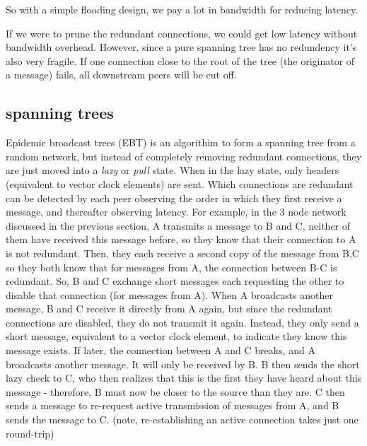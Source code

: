 \documentclass[sigconf]{acmart}
\begin{document}
So with a simple flooding design, we pay a lot in bandwidth for
reducing latency.

If we were to prune the redundant connections, we could get low
latency without bandwidth overhead. However, since a pure spanning
tree has no redundency it's also very fragile. If one connection close
to the root of the tree (the originator of a message) fails, all
downstream peers will be cut off.

\subsection{spanning trees}

Epidemic broadcast trees (EBT) is an algorithim to form a spanning
tree from a random network, but instead of completely removing
redundant connections, they are just moved into a {\em lazy} or {\em
  pull} state. When in the lazy state, only headers (equivalent to
vector clock elements) are sent. Which connections are redundant can
be detected by each peer observing the order in which they first
receive a message, and thereafter observing latency. For example, in
the 3 node network discussed in the previous section, A transmits a
message to B and C, neither of them have received this message before,
so they know that their connection to A is not redundant. Then, they
each receive a second copy of the message from B,C so they both know
that for messages from A, the connection between B-C is redundant.
So, B and C exchange short messages each requesting the other to
disable that connection (for messages from A). When A broadcasts
another message, B and C receive it directly from A again, but since
the redundant connections are disabled, they do not transmit it
again. Instead, they only send a short message, equivalent to a vector
clock element, to indicate they know this message exists. If later,
the connection between A and C breaks, and A broadcasts another
message. It will only be received by B.  B then sends the short lazy
check to C, who then realizes that this is the first they have heard
about this message - therefore, B must now be closer to the source
than they are.  C then sends a message to re-request active
transmission of messages from A, and B sends the message to C. (note,
re-establishing an active connection takes just one round-trip)
\end{document}
